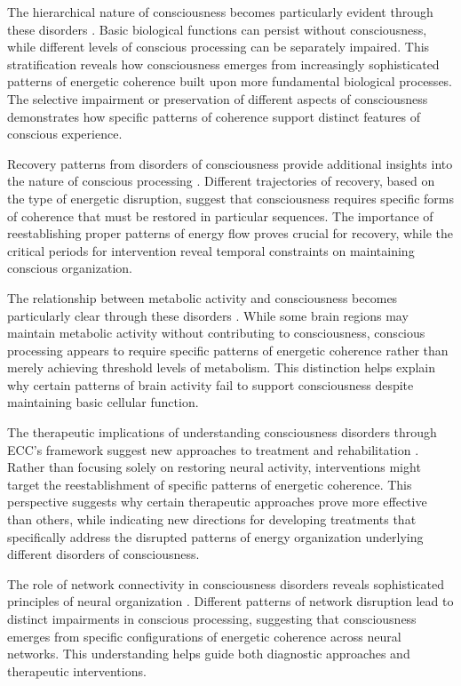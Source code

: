 The hierarchical nature of consciousness becomes particularly evident through these disorders \cite{Baars2005}. Basic biological functions can persist without consciousness, while different levels of conscious processing can be separately impaired. This stratification reveals how consciousness emerges from increasingly sophisticated patterns of energetic coherence built upon more fundamental biological processes. The selective impairment or preservation of different aspects of consciousness demonstrates how specific patterns of coherence support distinct features of conscious experience.

Recovery patterns from disorders of consciousness provide additional insights into the nature of conscious processing \cite{Schiff2010}. Different trajectories of recovery, based on the type of energetic disruption, suggest that consciousness requires specific forms of coherence that must be restored in particular sequences. The importance of reestablishing proper patterns of energy flow proves crucial for recovery, while the critical periods for intervention reveal temporal constraints on maintaining conscious organization.

The relationship between metabolic activity and consciousness becomes particularly clear through these disorders \cite{Massimini2005}. While some brain regions may maintain metabolic activity without contributing to consciousness, conscious processing appears to require specific patterns of energetic coherence rather than merely achieving threshold levels of metabolism. This distinction helps explain why certain patterns of brain activity fail to support consciousness despite maintaining basic cellular function.

The therapeutic implications of understanding consciousness disorders through ECC's framework suggest new approaches to treatment and rehabilitation \cite{Giacino2014}. Rather than focusing solely on restoring neural activity, interventions might target the reestablishment of specific patterns of energetic coherence. This perspective suggests why certain therapeutic approaches prove more effective than others, while indicating new directions for developing treatments that specifically address the disrupted patterns of energy organization underlying different disorders of consciousness.

The role of network connectivity in consciousness disorders reveals sophisticated principles of neural organization \cite{Dehaene2011}. Different patterns of network disruption lead to distinct impairments in conscious processing, suggesting that consciousness emerges from specific configurations of energetic coherence across neural networks. This understanding helps guide both diagnostic approaches and therapeutic interventions.

